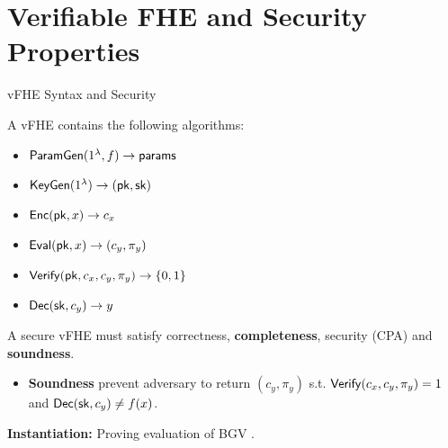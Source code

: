 \section{Verifiable FHE and Security Properties}
\begin{frame}{vFHE Syntax and Security}
	
	A vFHE contains the following algorithms:
	\begin{itemize}
		\item $\mathsf{ParamGen}(1^\lambda, f) \to \mathsf{params}$
		\item $\mathsf{KeyGen}(1^\lambda) \to (\mathsf{pk}, \mathsf{sk})$
		\item $\mathsf{Enc}(\mathsf{pk}, x)\to c_x$
		\item $\mathsf{Eval}(\mathsf{pk}, x)\to (c_y, \pi_y)$
		\item $\mathsf{Verify}(\mathsf{pk}, c_x, c_y, \pi_y)\to \{0,1\}$
		\item $\mathsf{Dec}(\mathsf{sk}, c_y)\to y$
	\end{itemize}
	
	A secure vFHE must satisfy correctness, \textbf{completeness}, security (CPA) and \textbf{soundness}.
	\begin{itemize}
		\item \textbf{Soundness} prevent adversary to return $(c_y, \pi_y)$ s.t. $\mathsf{Verify}(c_x, c_y, \pi_y) = 1$ and $\mathsf{Dec}(\mathsf{sk}, c_y) \not= f(x)$.
	\end{itemize}
	
	\textbf{Instantiation:} Proving evaluation of BGV \cite{ITCS:BraGenVai12}.
\end{frame}